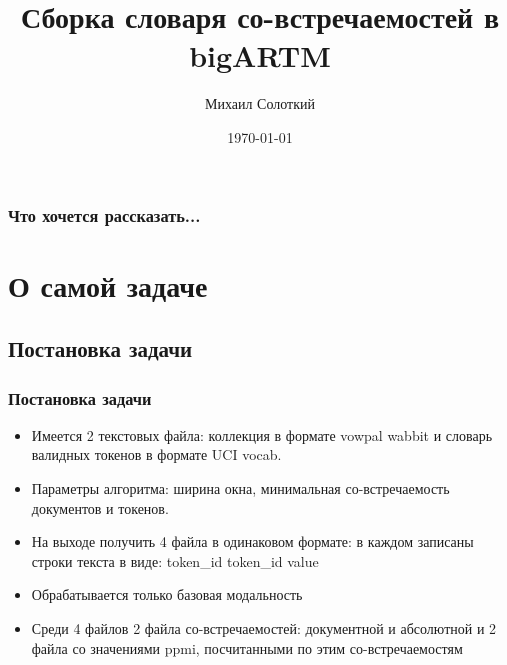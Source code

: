 \documentclass{beamer}
\title[]{Сборка словаря со-встречаемостей в bigARTM}
\author{Михаил Солоткий}
\institute[ВМК МГУ] %
{
\medskip
\textit{Московский государственный университет им. М.В.Ломоносова
\newline
Факультет вычислительной математики и кибернетики}
}
\date{\today} %
\begin{document}
\begin{frame}
\titlepage %
\end{frame}

\begin{frame}
\frametitle{Что хочется рассказать...}
\tableofcontents %
\end{frame}


\section{О самой задаче} 

\subsection{Постановка задачи}

\begin{frame}
\frametitle{Постановка задачи}
\begin{itemize}
\item Имеется 2 текстовых файла: коллекция в формате vowpal wabbit и словарь валидных токенов в формате UCI vocab.
\item Параметры алгоритма: ширина окна, минимальная со-встречаемость документов и токенов.
\item На выходе получить 4 файла в одинаковом формате: в каждом записаны строки текста в виде: token\_id token\_id value
\item Обрабатывается только базовая модальность
\item Среди 4 файлов 2 файла со-встречаемостей: документной и абсолютной и 2 файла со значениями ppmi, посчитанными по этим со-встречаемостям
\end{itemize}
\end{frame}
\end{document}
